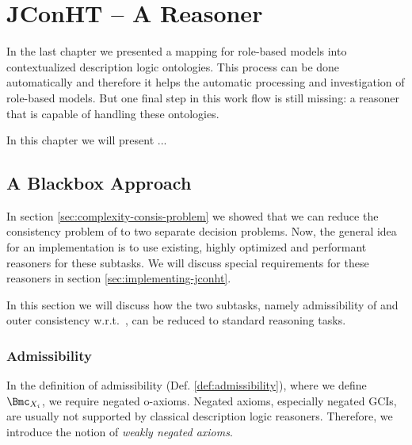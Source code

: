 
\chapter{JConHT -- A \texorpdfstring{\SHOIQSHOIQ}{SHOIQ[SHOIQ]} Reasoner}
\label{cha:jconht}

In the last chapter we presented a mapping for role-based models into contextualized description
logic ontologies. This process can be done automatically and therefore it helps the automatic
processing and investigation of role-based models. But one final step in this work flow is still
missing: a reasoner that is capable of handling these ontologies.

In this chapter we will present ...






\section{A Blackbox Approach}
\label{sec:blackbox-approach}

In section \ref{sec:complexity-consis-problem} we showed that we can reduce the consistency problem
of \LMLO to two separate decision problems. Now, the general idea for an implementation is to use
existing, highly optimized and performant reasoners for these subtasks. We will discuss special
requirements for these reasoners in section \ref{sec:implementing-jconht}. 

In this section we will discuss how the two subtasks, namely admissibility of \Xmc and outer
consistency w.r.t.\ \Xmc, can be reduced to standard reasoning tasks.



\subsection{Admissibility}
\label{sec:admissibility}

In the definition of admissibility (Def. \ref{def:admissibility}), where we define $\Bmc_{X_{i}}$,
we require negated o-axioms. Negated axioms, especially negated GCIs, are usually not supported by
classical description logic reasoners. Therefore, we introduce the notion of \emph{weakly negated
  axioms}.

